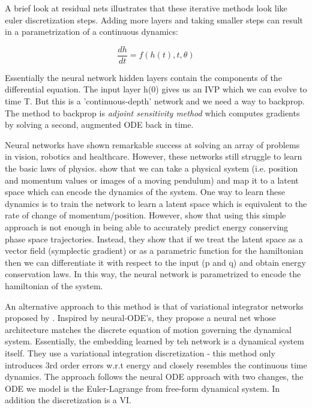 \documentclass{article}
\begin{document}
A brief look at residual nets illustrates that these iterative methods look like euler discretization steps. Adding more layers and taking smaller steps can result in a parametrization of a continuous dynamics:

$$ \frac{dh}{dt} = f(h(t),t,\theta) $$

Essentially the neural network hidden layers contain the components of the differential equation. The input layer h(0) gives us an IVP which we can evolve to time T. But this is a 'continuous-depth' network and we need a way to backprop. The method to backprop is \textit{adjoint sensitivity method}  which computes gradients by solving a second, augmented ODE back in time. 




Neural networks have shown remarkable success at solving an array of problems in vision, robotics and healthcare. However, these networks still struggle to learn the basic laws of physics. 
\cite{greydanus_hamiltonian_2019} show that we can take a physical system (i.e. position and momentum values or images of a moving pendulum) and map it to a latent space which can encode the dynamics of the system. One way to learn these dynamics is to train the network to learn a latent space which is equivalent to the rate of change of momentum/position. However, \cite{greydanus_hamiltonian_2019} show that using this simple approach is not enough in being able to accurately predict energy conserving phase space trajectories. Instead, they show that if we treat the latent space as a vector field (symplectic gradient) or as a parametric function for the hamiltonian then we can differentiate it with respect to the input (p and q) and obtain energy conservation laws. In this way, the neural network is parametrized to encode the hamiltonian of the system.

An alternative approach to this method is that of variational integrator networks proposed by \cite{saemundsson_variational_2019}. Inspired by neural-ODE's, they propose a neural net whose architecture matches the discrete equation of motion governing the dynamical system. Essentially, the embedding learned by teh network is a dynamical system itself. They use a variational integration discretization - this method only introduces 3rd order errors w.r.t energy and closely resembles the continuous time dynamics. The approach follows the neural ODE approach with two changes, the ODE we model is the Euler-Lagrange from free-form dynamical system. In addition the discretization is a VI. 
\end{document}
